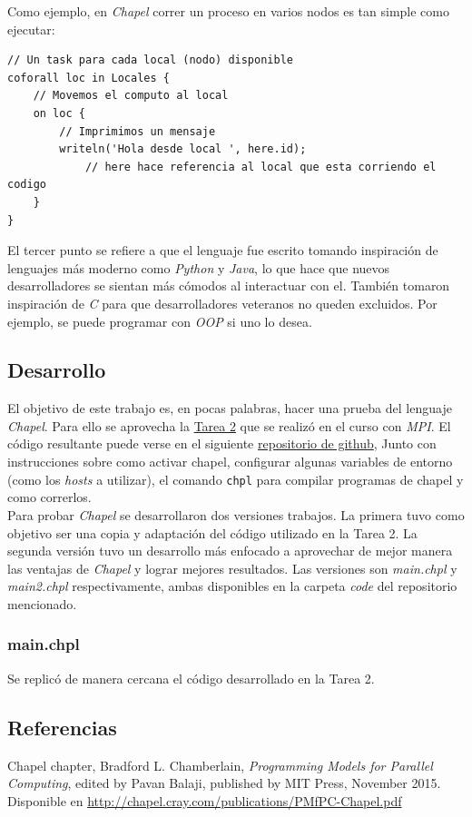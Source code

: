 \documentclass[10pt]{extarticle}
\begin{document}
Como ejemplo, en \textit{Chapel} correr un proceso en varios nodos es tan simple como ejecutar:

\begin{lstlisting}[language=Chapel]
// Un task para cada local (nodo) disponible
coforall loc in Locales {
	// Movemos el computo al local
	on loc {
		// Imprimimos un mensaje
		writeln('Hola desde local ', here.id);
			// here hace referencia al local que esta corriendo el codigo
	}
}
\end{lstlisting}

El tercer punto se refiere a que el lenguaje fue escrito tomando inspiración de lenguajes más moderno como \textit{Python} y \textit{Java}, lo que hace que nuevos desarrolladores se sientan más cómodos al interactuar con el. También tomaron inspiración de \textit{C} para que desarrolladores veteranos no queden excluidos. Por ejemplo, se puede programar con \textit{OOP} si uno lo desea.

\subsection*{Desarrollo}
El objetivo de este trabajo es, en pocas palabras, hacer una prueba del lenguaje \textit{Chapel}. Para ello se aprovecha la \href{https://github.com/negebauer/IIC3524-T2}{\color{blue!60}Tarea 2} que se realizó en el curso con \textit{MPI}. El código resultante puede verse en el siguiente \href{https://github.com/negebauer/IIC3524-Investigacion}{\color{blue!60}repositorio de github}, Junto con instrucciones sobre como activar chapel, configurar algunas variables de entorno (como los \textit{hosts} a utilizar), el comando \verb|chpl| para compilar programas de chapel y como correrlos.\\

Para probar \textit{Chapel} se desarrollaron dos versiones trabajos. La primera tuvo como objetivo ser una copia y adaptación del código utilizado en la Tarea 2. La segunda versión tuvo un desarrollo más enfocado a aprovechar de mejor manera las ventajas de \textit{Chapel} y lograr mejores resultados. Las versiones son \textit{main.chpl} y \textit{main2.chpl} respectivamente, ambas disponibles en la carpeta \textit{code} del repositorio mencionado.\\

\subsubsection*{main.chpl}

Se replicó de manera cercana el código desarrollado en la Tarea 2.


\subsection*{Referencias}
Chapel chapter, Bradford L. Chamberlain, \textit{Programming Models for Parallel Computing}, edited by Pavan Balaji, published by MIT Press, November 2015. Disponible en \href{http://chapel.cray.com/publications/PMfPC-Chapel.pdf}{\color{blue!60}http://chapel.cray.com/publications/PMfPC-Chapel.pdf}

%
\end{document}
